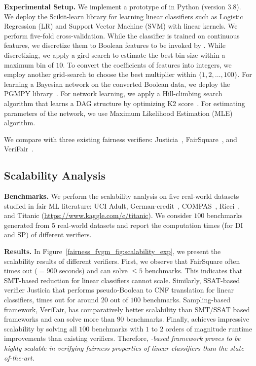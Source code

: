 \textbf{Experimental Setup.}
We  implement a  prototype of {\fvgm} in Python (version 3.8).  
We deploy the Scikit-learn library for learning linear classifiers such as Logistic Regression (LR) and Support Vector Machine (SVM) with linear kernels. We perform five-fold cross-validation. While the classifier is trained on continuous features, we discretize them to Boolean features to be invoked by {\fvgm}. While discretizing, we apply a gird-search to estimate the best bin-size within a maximum bin of $ 10 $. To convert the coefficients of features into integers, we employ another grid-search to choose the best multiplier within $ \{1,2, \dots, 100\} $. For learning a Bayesian network on the converted Boolean data, we deploy the PGMPY library~\cite{ankan2015pgmpy}. For network learning, we apply a Hill-climbing search algorithm that learns a DAG structure by optimizing K2 score~\cite{koller2009probabilistic}. For estimating parameters of the network, we use Maximum Likelihood Estimation (MLE) algorithm. 

We compare {\fvgm} with three existing fairness verifiers: Justicia~\cite{ghosh2020justicia}, FairSquare~\cite{albarghouthi2017fairsquare}, and VeriFair~\cite{bastani2019probabilistic}. 


\subsection{Scalability Analysis}
\textbf{Benchmarks.} We perform the scalability analysis on five real-world datasets studied in fair ML literature: UCI Adult, German-credit~\cite{DK2017}, COMPAS~\cite{angwin2016machine}, Ricci~\cite{mcginley2010ricci}, and Titanic (\url{https://www.kaggle.com/c/titanic}). We consider $ 100 $ benchmarks generated from 5 real-world datasets and report the computation times (for DI and SP) of different verifiers.

\textbf{Results.} In Figure~\ref{fairness_fvgm_fig:scalability_exp}, we present the scalability results of different verifiers. First, we observe that FairSquare often times out ($ =900 $ seconds) and can solve $ \le 5 $ benchmarks. This indicates that SMT-based reduction for linear classifiers cannot scale. Similarly, SSAT-based verifier Justicia that performs pseudo-Boolean to CNF translation for linear classifiers, times out for around $  20 $ out of $ 100 $ benchmarks. Sampling-based framework, VeriFair, has comparatively better scalability than SMT/SSAT based frameworks and can solve more than $ 90 $ benchmarks. Finally, {\fvgm} achieves impressive scalability by solving all $ 100 $ benchmarks with $ 1 $ to $ 2 $ orders of magnitude runtime improvements than existing verifiers. Therefore,\textit{ {\stochastic}-based framework {\fvgm} proves to be highly scalable in verifying fairness properties of linear classifiers than the state-of-the-art.} 

